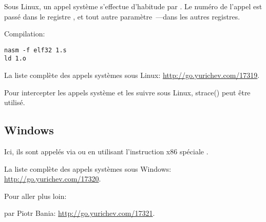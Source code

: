 Sous Linux, un appel système s'effectue d'habitude par .
Le numéro de l'appel est passé dans le registre \EAX, et tout autre paramètre~---dans
les autres registres.



Compilation:

\begin{lstlisting}
nasm -f elf32 1.s
ld 1.o
\end{lstlisting}

La liste complète des appels systèmes sous Linux: \url{http://go.yurichev.com/17319}.

Pour intercepter les appels système et les suivre sous Linux, strace()
peut être utilisé.

\subsection{Windows}


Ici, ils sont appelés via  ou en utilisant l'instruction x86 spéciale
.

La liste complète des appels systèmes sous Windows: \url{http://go.yurichev.com/17320}.

Pour aller plus loin:

 par Piotr Bania: \url{http://go.yurichev.com/17321}.

